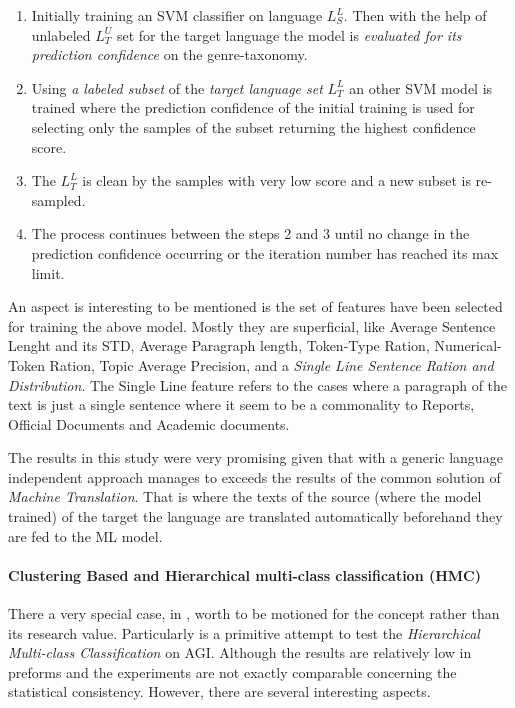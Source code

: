 \begin{enumerate}
\item Initially training an SVM classifier on language $L^{L}_{S}$. Then with the help of unlabeled $L^{U}_{T}$ set for the target language the model is \textit{evaluated for its prediction confidence} on the genre-taxonomy.
\item Using \textit{a labeled subset} of the \textit{target language set} $L^{L}_{T}$ an other SVM model is trained where the {prediction confidence} of the initial training is used for selecting only the samples of the subset returning the highest confidence score. 
\item The $L^{L}_{T}$  is clean by the samples with very low score and a new subset is re-sampled.
\item The process continues between the steps 2 and 3 until no change in the {prediction confidence} occurring or the iteration number has reached its max limit.
\end{enumerate}

An aspect is interesting to be mentioned is the set of features have been selected for training the above model. Mostly they are superficial, like Average Sentence Lenght and its STD, Average Paragraph length, Token-Type Ration, Numerical-Token Ration, Topic Average Precision, and a \textit{Single Line Sentence Ration and Distribution}. The Single Line feature refers to the cases where a paragraph of the text is just a single sentence where it seem to be a commonality to Reports, Official Documents and Academic documents.

The results in this study were very promising given that with a generic language independent approach manages to exceeds the results of the common solution of \textit{Machine Translation}. That is where the texts of the  source (where the model trained) of the target the language are translated automatically beforehand they are fed to the ML model.

\paragraph{Clustering Based and Hierarchical multi-class classification (HMC)} There a very special case, in \parencite{madjarov2015web}, worth to be motioned for the concept rather than its research value. Particularly is a primitive attempt to test the \textit{Hierarchical Multi-class Classification} on AGI. Although the results are relatively low in preforms and the experiments are not exactly comparable concerning the statistical consistency. However, there are several interesting aspects.

